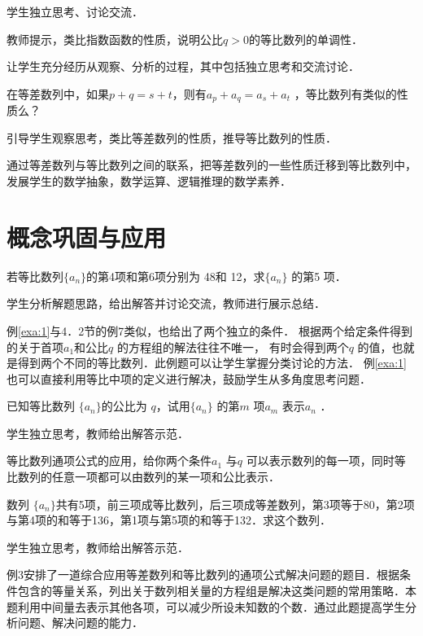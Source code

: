 \TSA 学生独立思考、讨论交流．

教师提示，类比指数函数的性质，说明公比$q>0$的等比数列的单调性．

\DP 让学生充分经历从观察、分析的过程，其中包括独立思考和交流讨论．

\begin{problem}
    在等差数列中，如果$p+q=s+t$，则有$a_p+a_q=a_s+a_t$ ，等比数列有类似的性质么？
\end{problem} 

\TSA 引导学生观察思考，类比等差数列的性质，推导等比数列的性质．

\DP 通过等差数列与等比数列之间的联系，把等差数列的一些性质迁移到等比数列中，发展学生的数学抽象，数学运算、逻辑推理的数学素养．

\section{概念巩固与应用}
\begin{example} \label{exa:1}
    若等比数列$\{a_n\}$的第4项和第6项分别为 48和 12，求$\{a_n\}$ 的第5 项．
\end{example}
\TSA 学生分析解题思路，给出解答并讨论交流，教师进行展示总结．

\DP  例\ref{exa:1}与4．2节的例7类似，也给出了两个独立的条件．
根据两个给定条件得到的关于首项$a_1$和公比$q$ 的方程组的解法往往不唯一，
有时会得到两个$q$ 的值，也就是得到两个不同的等比数列．此例题可以让学生掌握分类讨论的方法．
例\ref{exa:1}也可以直接利用等比中项的定义进行解决，鼓励学生从多角度思考问题．

\begin{example}
    已知等比数列 $\{a_n\}$的公比为 $q$，试用$\{a_n\}$ 的第$m$ 项$a_m$ 表示$a_n$ ．
\end{example}
\TSA 学生独立思考，教师给出解答示范．

\DP 等比数列通项公式的应用，给你两个条件$a_1$ 与$q$ 可以表示数列的每一项，同时等比数列的任意一项都可以由数列的某一项和公比表示．
\begin{example}
 数列 $\{a_n\}$共有5项，前三项成等比数列，后三项成等差数列，第3项等于80，第2项与第4项的和等于136，第1项与第5项的和等于132．求这个数列．
\end{example}
\TSA 学生独立思考，教师给出解答示范．

\DP 例3安排了一道综合应用等差数列和等比数列的通项公式解决问题的题目．根据条件包含的等量关系，列出关于数列相关量的方程组是解决这类问题的常用策略．本题利用中间量去表示其他各项，可以减少所设未知数的个数．通过此题提高学生分析问题、解决问题的能力．

